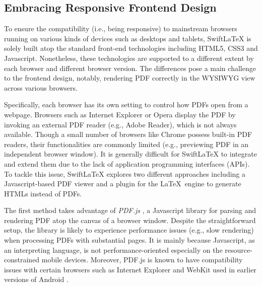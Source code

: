 \documentclass[sigconf]{acmart}
\begin{document}


\subsection{Embracing Responsive Frontend Design}
To ensure the compatibility (i.e., being responsive) to mainstream browsers running on various kinds of devices such as desktops and tablets, SwiftLaTeX is solely built atop the standard front-end technologies including HTML5, CSS3 and Javascript. 
Nonetheless, these technologies are supported to a different extent by each browser and different browser version. 
The differences pose a main challenge to the frontend design, notably, rendering PDF correctly  in the WYSIWYG view across various browsers.




Specifically, each browser has its own setting to control how PDFs open from a webpage. 
Browsers such as Internet Explorer or Opera display the PDF by invoking an external PDF reader (e.g., Adobe Reader), which is not always available.
Though a small number of browsers like Chrome possess built-in PDF readers, their functionalities are commonly limited (e.g., previewing PDF in an independent browser window). 
It is generally difficult for SwiftLaTeX to integrate and extend them due to the lack of application programming interfaces (APIs).
To tackle this issue, SwiftLaTeX explores two different approaches including a Javascript-based PDF viewer and a plugin for the \LaTeX\ engine to generate HTMLs instead of PDFs.

The first method takes advantage of \textit{PDF.js} \cite{pdfjsintro}, a Javascript library for parsing and rendering PDF atop the canvas of a browser window. Despite the straightforward setup, the library is likely to experience performance issues (e.g., slow rendering) when processing PDFs with substantial pages. It is mainly because Javascript, as an interpreting language, is not performance-oriented especially on the resource-constrained mobile devices. Moreover, PDF.js is known to have compatibility issues with certain browsers such as Internet Explorer and WebKit used in earlier versions of Android \cite{pdfjs}.
\end{document}
